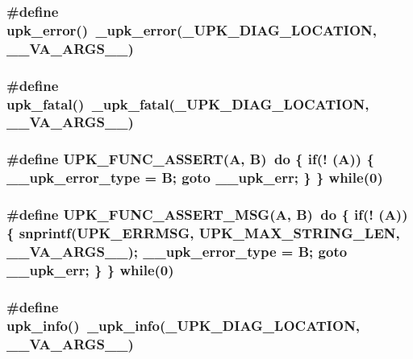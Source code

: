 \subsubsection{\setlength{\rightskip}{0pt plus 5cm}\#define upk\_\-error()~\_\-upk\_\-error(\_\-UPK\_\-DIAG\_\-LOCATION, \_\-\_\-VA\_\-ARGS\_\-\_\-)}\label{error_8h_27b090503575f3a1ee3c796f8b8ef7e8}


\subsubsection{\setlength{\rightskip}{0pt plus 5cm}\#define upk\_\-fatal()~\_\-upk\_\-fatal(\_\-UPK\_\-DIAG\_\-LOCATION, \_\-\_\-VA\_\-ARGS\_\-\_\-)}\label{error_8h_26ba69f2a5d79760a074951bcbe9559b}


\subsubsection{\setlength{\rightskip}{0pt plus 5cm}\#define UPK\_\-FUNC\_\-ASSERT(A, B)~do \{ if(! (A)) \{ \_\-\_\-upk\_\-error\_\-type = B; goto \_\-\_\-upk\_\-err; \} \} while(0)}\label{error_8h_e74b6ada05878c7921c0a022bbfb4e5b}


\subsubsection{\setlength{\rightskip}{0pt plus 5cm}\#define UPK\_\-FUNC\_\-ASSERT\_\-MSG(A, B)~do \{ if(! (A)) \{ snprintf(UPK\_\-ERRMSG, UPK\_\-MAX\_\-STRING\_\-LEN, \_\-\_\-VA\_\-ARGS\_\-\_\-); \_\-\_\-upk\_\-error\_\-type = B; goto \_\-\_\-upk\_\-err; \} \} while(0)}\label{error_8h_e32920b8438edda61aec14de4693ec55}


\subsubsection{\setlength{\rightskip}{0pt plus 5cm}\#define upk\_\-info()~\_\-upk\_\-info(\_\-UPK\_\-DIAG\_\-LOCATION, \_\-\_\-VA\_\-ARGS\_\-\_\-)}\label{error_8h_cbbbca1edc99421ba03ece46f8bb55be}


